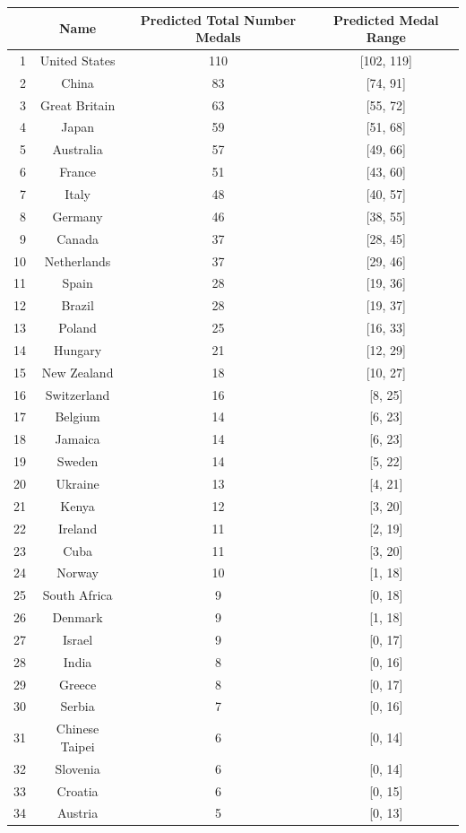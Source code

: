\documentclass{mcmthesis}
\begin{document}
\begin{longtable}{rccc}
\toprule
 & Name & Predicted Total Number Medals & Predicted Medal Range \\
\midrule
1 & United States & 110 & [102, 119] \\
2 & China & 83 & [74, 91] \\
3 & Great Britain & 63 & [55, 72] \\
4 & Japan & 59 & [51, 68] \\
5 & Australia & 57 & [49, 66] \\
6 & France & 51 & [43, 60] \\
7 & Italy & 48 & [40, 57] \\
8 & Germany & 46 & [38, 55] \\
9 & Canada & 37 & [28, 45] \\
10 & Netherlands & 37 & [29, 46] \\
11 & Spain & 28 & [19, 36] \\
12 & Brazil & 28 & [19, 37] \\
13 & Poland & 25 & [16, 33] \\
14 & Hungary & 21 & [12, 29] \\
15 & New Zealand & 18 & [10, 27] \\
16 & Switzerland & 16 & [8, 25] \\
17 & Belgium & 14 & [6, 23] \\
18 & Jamaica & 14 & [6, 23] \\
19 & Sweden & 14 & [5, 22] \\
20 & Ukraine & 13 & [4, 21] \\
21 & Kenya & 12 & [3, 20] \\
22 & Ireland & 11 & [2, 19] \\
23 & Cuba & 11 & [3, 20] \\
24 & Norway & 10 & [1, 18] \\
25 & South Africa & 9 & [0, 18] \\
26 & Denmark & 9 & [1, 18] \\
27 & Israel & 9 & [0, 17] \\
28 & India & 8 & [0, 16] \\
29 & Greece & 8 & [0, 17] \\
30 & Serbia & 7 & [0, 16] \\
31 & Chinese Taipei & 6 & [0, 14] \\
32 & Slovenia & 6 & [0, 14] \\
33 & Croatia & 6 & [0, 15] \\
34 & Austria & 5 & [0, 13] \\

\end{longtable}
\end{document}

